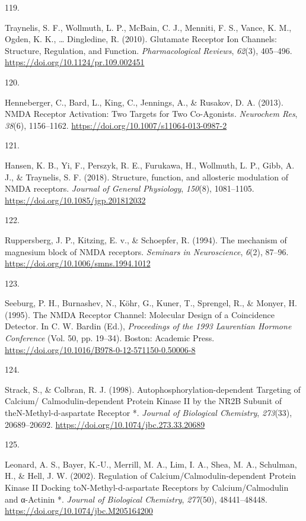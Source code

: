 \documentclass[
  11pt,
  letterpaper,
]{scrreprt}
\newlength{\cslhangindent}
\newlength{\csllabelwidth}
\newenvironment{CSLReferences}[2] %
 {\begin{list}{}{%
  \setlength{\itemindent}{0pt}
  \setlength{\leftmargin}{0pt}
  \setlength{\parsep}{0pt}
  \ifodd #1
   \setlength{\leftmargin}{\cslhangindent}
   \setlength{\itemindent}{-1\cslhangindent}
  \fi
  \setlength{\itemsep}{#2\baselineskip}}}
 {\end{list}}
\newcommand{\CSLLeftMargin}[1]{\parbox[t]{\csllabelwidth}{\strut#1\strut}}
\newcommand{\CSLRightInline}[1]{\parbox[t]{\linewidth - \csllabelwidth}{\strut#1\strut}}
\begin{document}
\begin{CSLReferences}{0}{0}
\CSLLeftMargin{119. }%
\CSLRightInline{Traynelis, S. F., Wollmuth, L. P., McBain, C. J.,
Menniti, F. S., Vance, K. M., Ogden, K. K., \ldots{} Dingledine, R.
(2010). Glutamate {Receptor Ion Channels}: {Structure}, {Regulation},
and {Function}. \emph{Pharmacological Reviews}, \emph{62}(3), 405--496.
\url{https://doi.org/10.1124/pr.109.002451}}

\CSLLeftMargin{120. }%
\CSLRightInline{Henneberger, C., Bard, L., King, C., Jennings, A., \&
Rusakov, D. A. (2013). {NMDA Receptor Activation}: {Two Targets} for
{Two Co-Agonists}. \emph{Neurochem Res}, \emph{38}(6), 1156--1162.
\url{https://doi.org/10.1007/s11064-013-0987-2}}

\CSLLeftMargin{121. }%
\CSLRightInline{Hansen, K. B., Yi, F., Perszyk, R. E., Furukawa, H.,
Wollmuth, L. P., Gibb, A. J., \& Traynelis, S. F. (2018). Structure,
function, and allosteric modulation of {NMDA} receptors. \emph{Journal
of General Physiology}, \emph{150}(8), 1081--1105.
\url{https://doi.org/10.1085/jgp.201812032}}

\CSLLeftMargin{122. }%
\CSLRightInline{Ruppersberg, J. P., Kitzing, E. v., \& Schoepfer, R.
(1994). The mechanism of magnesium block of {NMDA} receptors.
\emph{Seminars in Neuroscience}, \emph{6}(2), 87--96.
\url{https://doi.org/10.1006/smns.1994.1012}}

\CSLLeftMargin{123. }%
\CSLRightInline{Seeburg, P. H., Burnashev, N., Köhr, G., Kuner, T.,
Sprengel, R., \& Monyer, H. (1995). The {NMDA Receptor Channel}:
{Molecular Design} of a {Coincidence Detector}. In C. W. Bardin (Ed.),
\emph{Proceedings of the 1993 {Laurentian Hormone Conference}} (Vol. 50,
pp. 19--34). Boston: Academic Press.
\url{https://doi.org/10.1016/B978-0-12-571150-0.50006-8}}

\CSLLeftMargin{124. }%
\CSLRightInline{Strack, S., \& Colbran, R. J. (1998).
Autophosphorylation-dependent {Targeting} of {Calcium}/
{Calmodulin-dependent Protein Kinase II} by the {NR2B Subunit} of
{theN-Methyl-d-aspartate Receptor} *. \emph{Journal of Biological
Chemistry}, \emph{273}(33), 20689--20692.
\url{https://doi.org/10.1074/jbc.273.33.20689}}

\CSLLeftMargin{125. }%
\CSLRightInline{Leonard, A. S., Bayer, K.-U., Merrill, M. A., Lim, I.
A., Shea, M. A., Schulman, H., \& Hell, J. W. (2002). Regulation of
{Calcium}/{Calmodulin-dependent Protein Kinase II Docking
toN-Methyl-d-aspartate Receptors} by {Calcium}/{Calmodulin} and
α-{Actinin} *. \emph{Journal of Biological Chemistry}, \emph{277}(50),
48441--48448. \url{https://doi.org/10.1074/jbc.M205164200}}


\end{CSLReferences}
\end{document}
